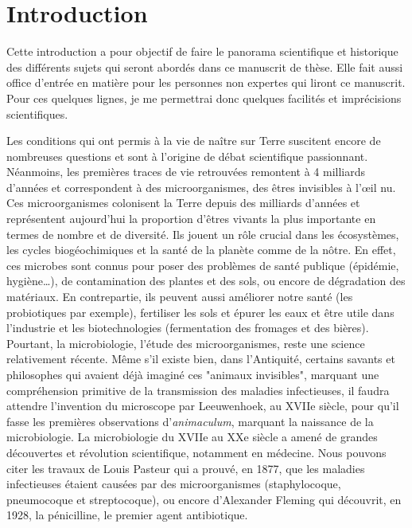 \chapter*{Introduction}

Cette introduction a pour objectif de faire le panorama scientifique et historique des différents sujets qui seront abordés dans ce manuscrit de thèse. Elle fait aussi office d'entrée en matière pour les personnes non expertes qui liront ce manuscrit. Pour ces quelques lignes, je me permettrai donc quelques facilités et imprécisions scientifiques.%


Les conditions qui ont permis à la vie de naître sur Terre suscitent encore de nombreuses questions et sont à l'origine de débat scientifique passionnant. Néanmoins, les premières traces de vie retrouvées remontent à 4 milliards d'années et correspondent à des microorganismes, des êtres invisibles à l'{\oe}il nu. Ces microorganismes colonisent la Terre depuis des milliards d'années et représentent aujourd'hui la proportion d'êtres vivants la plus importante en termes de nombre et de diversité. Ils jouent un rôle crucial dans les écosystèmes, les cycles biogéochimiques et la santé de la planète comme de la nôtre. En effet, ces microbes sont connus pour poser des problèmes de santé publique (épidémie, hygiène\dots), de contamination des plantes et des sols, ou encore de dégradation des matériaux. En contrepartie, ils peuvent aussi améliorer notre santé (les probiotiques par exemple), fertiliser les sols et épurer les eaux et être utile dans l'industrie et les biotechnologies (fermentation des fromages et des bières). Pourtant, la microbiologie, l'étude des microorganismes, reste une science relativement récente. Même s'il existe bien, dans l'Antiquité, certains savants et philosophes qui avaient déjà imaginé ces "animaux invisibles", marquant une compréhension primitive de la transmission des maladies infectieuses, il faudra attendre l'invention du microscope par Leeuwenhoek, au XVIIe siècle, pour qu'il fasse les premières observations d'\textit{animaculum}, marquant la naissance de la microbiologie. La microbiologie du XVIIe au XXe siècle a amené de grandes découvertes et révolution scientifique, notamment en médecine. Nous pouvons citer les travaux de Louis Pasteur qui a prouvé, en 1877, que les maladies infectieuses étaient causées par des microorganismes (staphylocoque, pneumocoque et streptocoque), ou encore d'Alexander Fleming qui découvrit, en 1928, la pénicilline, le premier agent antibiotique. 


